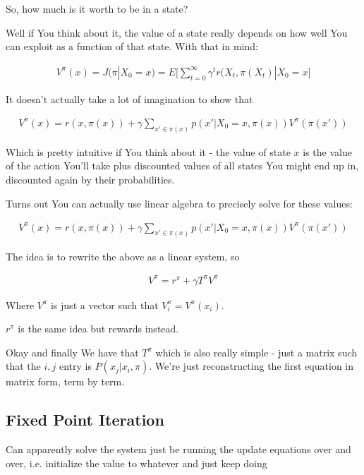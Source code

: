 \documentclass{article}
\begin{document}
		So, how much is it worth to be in a state? 
		
		Well if You think about it, the value of a state really depends on how well You can exploit as a function of that state. With that in mind:
		
		\begin{align}
			V^\pi(x) = J(\pi|X_0=x) = E\bigg[ \sum^\infty_{t=0} \gamma^t r(X_t, \pi(X_t) | X_0 = x \bigg]
		\end{align}
		
		It doesn't actually take a lot of imagination to show that 
		
		\begin{align}
			V^\pi(x) = r(x, \pi(x)) + \gamma\sum_{x'\in\pi(x)} p(x'|X_0=x, \pi(x))  V^\pi(\pi(x'))
		\end{align}		
		
		Which is pretty intuitive if You think about it - the value of state $x$ is the value of the action You'll take plus discounted values of all states You might end up in, discounted again by their probabilities. 
		
		Turns out You can actually use linear algebra to precisely solve for these values:
		
		\begin{align}
			V^\pi(x) = r(x, \pi(x)) + \gamma\sum_{x'\in\pi(x)} p(x'|X_0=x, \pi(x))  V^\pi(\pi(x'))
		\end{align}
		
		The idea is to rewrite the above as a linear system, so
		
		\begin{align}
			V^\pi  = r^\pi + \gamma T^\pi V^\pi
		\end{align}
		
		Where $V^\pi$ is just a vector such that $V^\pi_i = V^\pi(x_i)$.
		
		$r^\pi$ is the same idea but rewards instead.
		
		Okay and finally We have that $T^\pi$ which is also really simple - just a matrix such that the $i, j$ entry is $P(x_j|x_i, \pi)$. We're just reconstructing the first equation in matrix form, term by term. 
		
	\subsection{Fixed Point Iteration}
	
		Can apparently solve the system just be running the update equations over and over, i.e. initialize the value to whatever and just keep doing
		
\end{document}
